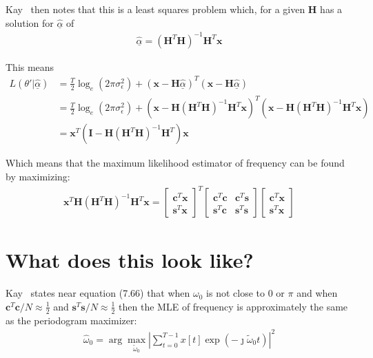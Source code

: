 \documentclass[11pt]{article}
\newcommand{\bc}{\mathbf{c}}
\newcommand{\bs}{\mathbf{s}}
\newcommand{\bx}{\mathbf{x}}
\newcommand{\bH}{\mathbf{H}}
\begin{document}
Kay~\cite{Kay1997}  then notes that this is a least squares problem which, for a given $\bH$ has a solution for $\hat{\underline{\alpha}}$ of
\begin{align}
\hat{\underline{\alpha}} = \left ( \bH^T \bH \right )^{-1} \bH^T \bx
\end{align}

This means
\begin{align}
L(\theta' | \hat{\underline{\alpha}}) &=  \frac{T}{2}\log_e(2\pi \sigma_\epsilon^2)  + (\bx - \bH\hat{\underline{\alpha}} )^T  (\bx  - \bH \hat{\underline{\alpha}} ) \\
&=  \frac{T}{2}\log_e(2\pi \sigma_\epsilon^2)  + (\bx - \bH  \left ( \bH^T \bH \right )^{-1} \bH^T \bx )^T  (\bx  - \bH  \left ( \bH^T \bH \right )^{-1} \bH^T \bx )\\
&= \bx^T \left ( \mathbf{I} -  \bH  \left ( \bH^T \bH \right )^{-1} \bH^T \right) \bx
\end{align}

Which means that the maximum likelihood estimator of frequency can be found by maximizing:
\begin{align}
\bx^T  \bH  \left ( \bH^T \bH \right )^{-1} \bH^T\bx = 
\left [  \begin{matrix} \bc^T \bx \\ \bs^T \bx \end{matrix} \right ]^T
\left [  \begin{matrix} \bc^T \bc  & \bc^T \bs \\ \bs^T \bc & \bs^T \bs \end{matrix} \right ]
\left [  \begin{matrix} \bc^T \bx \\ \bs^T \bx \end{matrix} \right ]\label{eq:mle}
\end{align}

\section{What does this look like?}

Kay~\cite{Kay1997} states near equation (7.66) that when $\omega_0$ is not close to 0 or $\pi$ and when $\bc^T \bc/N \approx \frac{1}{2}$ and $\bs^T \bs/N \approx \frac{1}{2}$ then the MLE of frequency is approximately the same as the periodogram maximizer:
\begin{align}
\hat{\omega}_0 = \arg \max_{\tilde{\omega}_0} \left |  \sum_{t=0}^{T-1} x[t] \exp(-\jmath \tilde{\omega}_0 t) \right |^2\label{eq:per}
\end{align}
\end{document}
